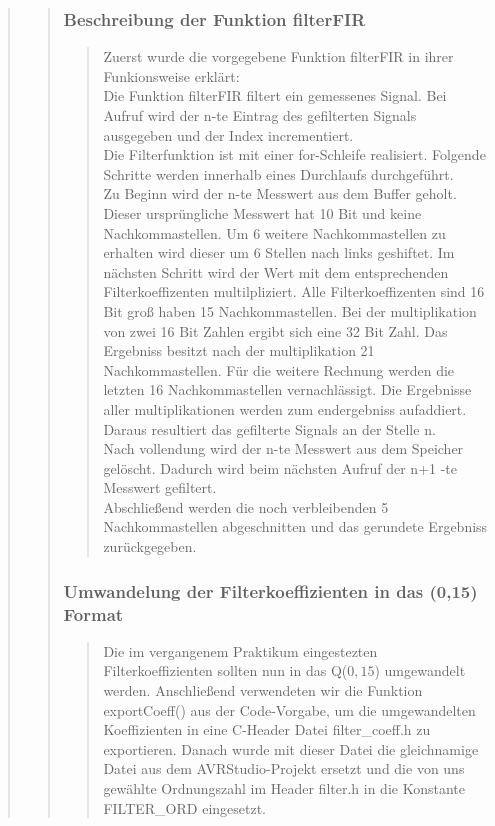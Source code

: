 \begin{quote}
\begin{quote}
    	\subsubsection{Beschreibung der Funktion filterFIR}
    	\begin{quote}
    	Zuerst wurde die vorgegebene Funktion filterFIR in ihrer Funkionsweise
    	erklärt:\\ 
    	Die Funktion filterFIR filtert ein gemessenes Signal. Bei Aufruf
    	wird der n-te Eintrag des gefilterten Signals ausgegeben und der Index incrementiert.\\
    	Die Filterfunktion ist mit einer for-Schleife realisiert. Folgende Schritte werden innerhalb eines Durchlaufs
    	durchgeführt.\\
    	Zu Beginn wird der n-te Messwert aus dem Buffer geholt. Dieser ursprüngliche Messwert hat 10 Bit und keine
    	Nachkommastellen. Um 6 weitere Nachkommastellen zu erhalten wird dieser um 6 Stellen nach links geshiftet. Im
        nächsten Schritt wird der Wert mit dem entsprechenden Filterkoeffizenten multilpliziert. Alle Filterkoeffizenten
        sind 16 Bit groß haben 15 Nachkommastellen. Bei der multiplikation von zwei 16 Bit Zahlen ergibt sich eine 32
        Bit Zahl. Das Ergebniss besitzt nach der multiplikation 21 Nachkommastellen. Für die weitere Rechnung werden die
        letzten 16 Nachkommastellen vernachlässigt. Die Ergebnisse aller multiplikationen werden zum endergebniss
        aufaddiert. Daraus resultiert das gefilterte Signals an der Stelle n.\\
        Nach vollendung wird der n-te Messwert aus dem Speicher gelöscht. Dadurch wird beim nächsten Aufruf der n+1 -te
        Messwert gefiltert.\\
        Abschließend werden die noch verbleibenden 5 Nachkommastellen abgeschnitten und das gerundete Ergebniss
        zurückgegeben.
        
		\end{quote}
		
		\subsubsection{Umwandelung der Filterkoeffizienten in das (0,15) Format}
		\begin{quote}
		
		Die im vergangenem Praktikum eingestezten Filterkoeffizienten sollten nun in
		das Q($0,15$) umgewandelt werden. 
		Anschließend verwendeten wir die Funktion exportCoeff() aus der Code-Vorgabe,
		um die umgewandelten Koeffizienten in eine C-Header Datei filter_coeff.h zu
		exportieren. Danach wurde mit dieser Datei die gleichnamige Datei aus dem
		AVRStudio-Projekt ersetzt und die von uns gewählte Ordnungszahl im Header
		filter.h in die Konstante FILTER_ORD eingesetzt. 
		

\end{quote}
\end{quote}
\end{quote}
